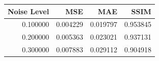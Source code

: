 \begin{tabular}{rrrr}
\toprule
Noise Level & MSE & MAE & SSIM \\
\midrule
0.100000 & 0.004229 & 0.019797 & 0.953845 \\
0.200000 & 0.005363 & 0.023021 & 0.937131 \\
0.300000 & 0.007883 & 0.029112 & 0.904918 \\
\bottomrule
\end{tabular}
